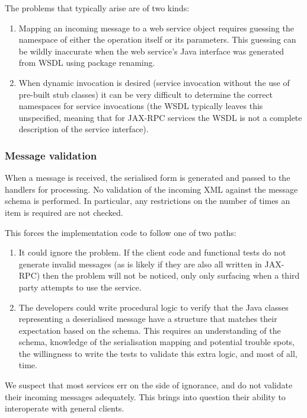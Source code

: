 The problems that typically arise are of two kinds:
\begin{enumerate}
\item Mapping an incoming message to a web service object requires
guessing the namespace of either the operation itself or its
parameters. This guessing can be wildly inaccurate when the web
service's Java interface was generated from WSDL using package
renaming.
\item When dynamic invocation is desired (service invocation without
the use of pre-built stub classes) it can be very difficult to
determine the correct namespaces for service invocations (the WSDL
typically leaves this unspecified, meaning that for JAX-RPC services
the WSDL is not a complete description of the service interface).
\end{enumerate}

\subsubsection{Message validation}
\label{objections:o-x:validation}

When a message is received, the serialised form is generated and
passed to the handlers for processing. No validation of the incoming
XML against the message schema is performed. In particular, any
restrictions on the number of times an item is required are not
checked.

This forces the implementation code to follow one of two paths:
\begin{enumerate}
\item It could ignore the problem. If the client code and functional
tests do not generate invalid messages (as is likely if they are also
all written in JAX-RPC) then the problem will not be noticed, only
only surfacing when a third party attempts to use the service.

\item The developers could write procedural logic to verify that
the Java classes representing a deserialised message have a
structure that matches their expectation based on the schema. This
requires an understanding of the schema, knowledge of the
serialisation mapping and potential trouble spots, the willingness to
write the tests to validate this extra logic, and most of all, time.
\end{enumerate}

We suspect that most services err on the side of ignorance, and do not
validate their incoming messages adequately. This brings into question
their ability to interoperate with general clients.

